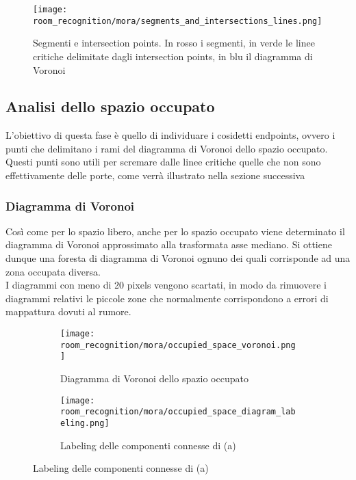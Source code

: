 \begin{figure}[H]
  \centering
  \texttt{[image: room\_recognition/mora/segments\_and\_intersections\_lines.png]}
  \caption{Segmenti e intersection points. In rosso i segmenti, in verde le linee critiche delimitate dagli intersection points, in blu il diagramma di Voronoi}
\end{figure}
\subsection{Analisi dello spazio occupato}
L'obiettivo di questa fase è quello di individuare i cosidetti endpoints, ovvero i punti che delimitano i rami del diagramma di Voronoi dello spazio occupato. Questi punti sono utili per scremare dalle linee critiche quelle che non sono effettivamente delle porte, come verrà illustrato nella sezione successiva
\subsubsection{Diagramma di Voronoi}
Così come per lo spazio libero, anche per lo spazio occupato viene determinato il diagramma di Voronoi approssimato alla trasformata asse mediano. Si ottiene dunque una foresta di diagramma di Voronoi ognuno dei quali corrisponde ad una zona occupata diversa. \\
I diagrammi con meno di 20 pixels vengono scartati, in modo da rimuovere i diagrammi relativi le piccole zone che normalmente corrispondono a errori di mappattura dovuti al rumore.

\begin{figure}
  \centering
  \begin{subfigure}[t]{0.45\textwidth}
    \centering
    \texttt{[image: room\_recognition/mora/occupied\_space\_voronoi.png]}
    \caption{Diagramma di Voronoi dello spazio occupato}
  \end{subfigure}
  \begin{subfigure}[t]{0.45\textwidth}
    \centering
    \texttt{[image: room\_recognition/mora/occupied\_space\_diagram\_labeling.png]}
    \caption{Labeling delle componenti connesse di (a)}
  \end{subfigure}
\end{figure}

